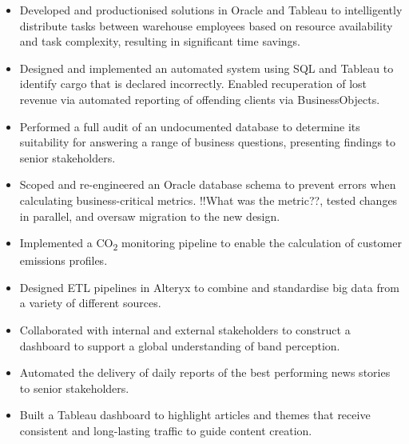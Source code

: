 \documentclass[10pt,a4paper,ragged2e,withhyper]{altacv}
\begin{document}
\begin{paracol}{2}
\divider

\begin{itemize}
\item Developed and productionised solutions in Oracle and Tableau to intelligently distribute tasks between warehouse employees based on resource availability and task complexity, resulting in significant time savings.
\item Designed and implemented an automated system using SQL and Tableau to identify cargo that is declared incorrectly. Enabled recuperation of lost revenue via automated reporting of offending clients via BusinessObjects.
\item Performed a full audit of an undocumented database to determine its suitability for answering a range of business questions, presenting findings to senior stakeholders.
\item Scoped and re-engineered an Oracle database schema to prevent errors when calculating business-critical metrics. !!What was the metric??, tested changes in parallel, and oversaw migration to the new design.
\item Implemented a CO\textsubscript{2} monitoring pipeline to enable the calculation of customer emissions profiles.
\end{itemize}

\divider

\begin{itemize}
\item Designed ETL pipelines in Alteryx to combine and standardise big data from a variety of different sources.
\item Collaborated with internal and external stakeholders to construct a dashboard to support a global understanding of band perception.
\item Automated the delivery of daily reports of the best performing news stories to senior stakeholders.
\item Built a Tableau dashboard to highlight articles and themes that receive consistent and long-lasting traffic to guide content creation.


\end{itemize}
\end{paracol}
\end{document}
